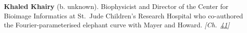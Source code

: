 \textbf{Khaled Khairy} (b. unknown). Biophysicist and Director of the Center for Bioimage Informatics at St.~Jude Children's Research Hospital who co-authored the Fourier-parameterised elephant curve with Mayer and Howard. \emph{[Ch.~\hyperref[ch:hough]{41}]}

